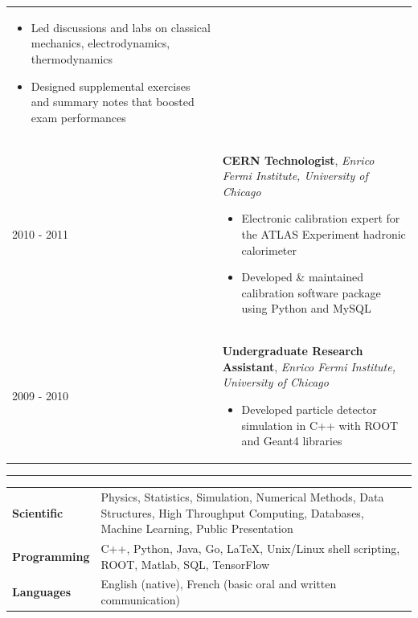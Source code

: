 \documentclass{letter}
\begin{document}
\begin{tabular}{p{}p{}}
\begin{itemize}
		\itemsep0em
		\renewcommand{\labelitemi}{\tiny$\blacksquare$} 
		\item Led discussions and labs on classical mechanics, electrodynamics, thermodynamics
    		\item Designed supplemental exercises and summary notes that boosted exam performances
	\end{itemize}
\\
	2010 - 2011
	&
	\textbf{CERN Technologist}, \textit{Enrico Fermi Institute, University of Chicago} \newline
	\vspace{-15pt}      %
	\begin{itemize}
		\itemsep0em
		\renewcommand{\labelitemi}{\tiny$\blacksquare$} 
   		\item Electronic calibration expert for the ATLAS Experiment hadronic calorimeter
   		\item Developed \& maintained calibration software package using Python and MySQL
	\end{itemize}
\\
	2009 - 2010
	&
	\textbf{Undergraduate Research Assistant}, \textit{Enrico Fermi Institute, University of Chicago} \newline
	\vspace{-15pt}      %
	\begin{itemize}
		\itemsep0em
		\renewcommand{\labelitemi}{\tiny$\blacksquare$} 
   		\item Developed particle detector simulation in C++ with ROOT and Geant4 libraries
	\end{itemize}
\end{tabular}

\vspace{-10pt}


\begin{flushleft}
\Large{\textsc{\textbf{\color{Maroon}{Skills}}}}
\vspace{1pt} %
\hrule
\end{flushleft}

\begin{tabular}{p{}p{}}
	{\bf Scientific} 
	&
	Physics, Statistics, Simulation, Numerical Methods, Data Structures, High Throughput Computing, Databases, Machine Learning, Public Presentation \newline
\\
	{\bf Programming} 
	&
	C++, Python, Java, Go, \LaTeX{}, Unix/Linux shell scripting, ROOT, Matlab, SQL, TensorFlow \newline
\\ 
	{\bf Languages}
	&
	English (native), French (basic oral and written communication)
\end{tabular}
\end{document}
